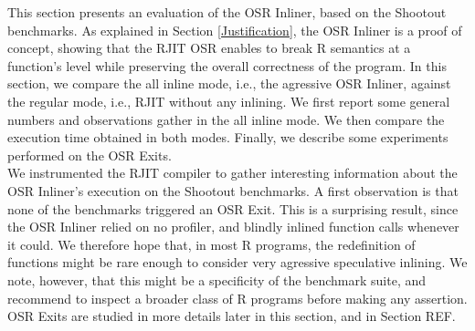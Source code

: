 

This section presents an evaluation of the OSR Inliner, based on the Shootout benchmarks\cite{Shootout}.
As explained in Section \ref{Justification}, the OSR Inliner is a proof of concept, showing that the RJIT OSR enables to break R semantics at a function's level while preserving the overall correctness of the program.
In this section, we compare the all inline mode, i.e., the agressive OSR Inliner, against the regular mode, i.e., RJIT without any inlining.
We first report some general numbers and observations gather in the all inline mode. 
We then compare the execution time obtained in both modes.
Finally, we describe some experiments performed on the OSR Exits.\\


We instrumented the RJIT compiler to gather interesting information about the OSR Inliner's execution on the Shootout benchmarks.
A first observation is that none of the benchmarks triggered an OSR Exit.
This is a surprising result, since the OSR Inliner relied on no profiler, and blindly inlined function calls whenever it could.
We therefore hope that, in most R programs, the redefinition of functions might be rare enough to consider very agressive speculative inlining.
We note, however, that this might be a specificity of the benchmark suite, and recommend to inspect a broader class of R programs before making any assertion.
OSR Exits are studied in more details later in this section, and in Section REF.\\

